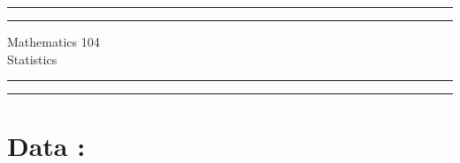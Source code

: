 \documentclass[12pt,oneside]{book}
\begin{document}
\begin{center}
	\vspace*{\baselineskip} %
	
	\rule{\textwidth}{1.6pt}\vspace*{-\baselineskip}\vspace*{2.5pt}
	\rule{\textwidth}{0.4pt}
	
	\vspace{0.75\baselineskip}
	
	{\huge Mathematics 104}\\
	Statistics\\ 
	\vspace{0.25\baselineskip}
	
	\rule{\textwidth}{0.4pt}\vspace*{-\baselineskip}\vspace{3.7pt} 
	\rule{\textwidth}{1.6pt} 
\end{center}
\pagestyle{empty}



\section*{Data : \ID}
\data
\end{document}
